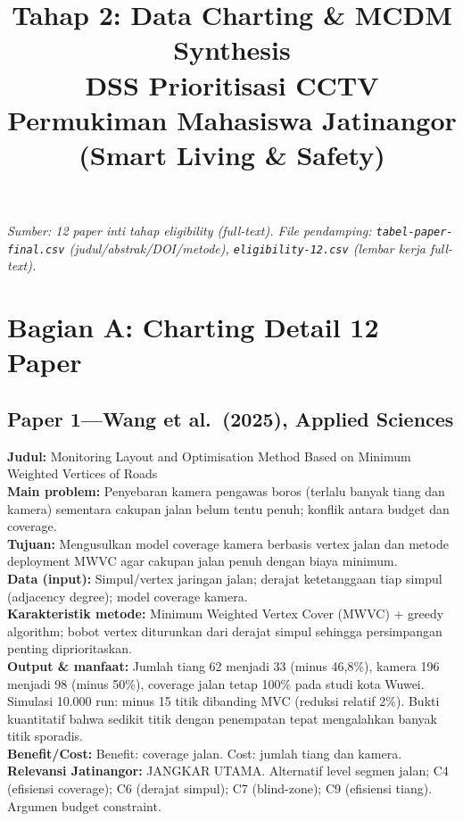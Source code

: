 \documentclass[a4paper,11pt]{article}
\title{Tahap 2: Data Charting \& MCDM Synthesis\\
\large DSS Prioritisasi CCTV Permukiman Mahasiswa Jatinangor (Smart Living \& Safety)}
\date{}
\begin{document}
\maketitle

\noindent\textit{Sumber: 12 paper inti tahap eligibility (full-text). File pendamping: \texttt{tabel-paper-final.csv} (judul/abstrak/DOI/metode), \texttt{eligibility-12.csv} (lembar kerja full-text).}

\section*{Bagian A: Charting Detail 12 Paper}

\subsection*{Paper 1---Wang et al.\ (2025), Applied Sciences}
\textbf{Judul:} Monitoring Layout and Optimisation Method Based on Minimum Weighted Vertices of Roads\\
\textbf{Main problem:} Penyebaran kamera pengawas boros (terlalu banyak tiang dan kamera) sementara cakupan jalan belum tentu penuh; konflik antara budget dan coverage.\\
\textbf{Tujuan:} Mengusulkan model coverage kamera berbasis vertex jalan dan metode deployment MWVC agar cakupan jalan penuh dengan biaya minimum.\\
\textbf{Data (input):} Simpul/vertex jaringan jalan; derajat ketetanggaan tiap simpul (adjacency degree); model coverage kamera.\\
\textbf{Karakteristik metode:} Minimum Weighted Vertex Cover (MWVC) + greedy algorithm; bobot vertex diturunkan dari derajat simpul sehingga persimpangan penting diprioritaskan.\\
\textbf{Output \& manfaat:} Jumlah tiang 62 menjadi 33 (minus 46,8\%), kamera 196 menjadi 98 (minus 50\%), coverage jalan tetap 100\% pada studi kota Wuwei. Simulasi 10.000 run: minus 15 titik dibanding MVC (reduksi relatif 2\%). Bukti kuantitatif bahwa sedikit titik dengan penempatan tepat mengalahkan banyak titik sporadis.\\
\textbf{Benefit/Cost:} Benefit: coverage jalan. Cost: jumlah tiang dan kamera.\\
\textbf{Relevansi Jatinangor:} JANGKAR UTAMA. Alternatif level segmen jalan; C4 (efisiensi coverage); C6 (derajat simpul); C7 (blind-zone); C9 (efisiensi tiang). Argumen budget constraint.
\end{document}

